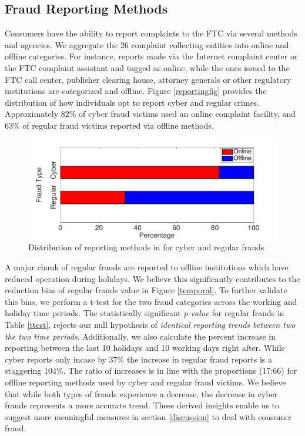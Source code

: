 \documentclass[conference]{IEEEtran}
\begin{document}
\subsection{Fraud Reporting Methods}\label{reportingmethods}
Consumers have the ability to report complaints to the FTC via several methods and agencies. We aggregate the 26 complaint collecting entities into online and offline categories. For instance, reports made via the Internet complaint center or the FTC complaint assistant and tagged as online, while the ones issued to the FTC call center, publisher clearing house, attorney generals or other regulatory institutions are categorized and offline. Figure \ref{reportingfig} provides the distribution of how individuals opt to report cyber and regular crimes. Approximately 82\% of cyber fraud victims used an online complaint facility, and 63\% of regular fraud victims reported via offline methods.


 \begin{figure}[b]
\centering
  \includegraphics[scale=0.35]{graphics/reporting_methods.pdf}
  \caption{Distribution of reporting methods in for cyber and regular frauds}
  \label{cdffig}
\end{figure}

A major chunk of regular frauds are reported to offline institutions which have reduced operation during holidays. We believe this significantly contributes to the reduction bias of regular frauds value in Figure \ref{temporal}. To further validate this bias, we perform a t-test for the two fraud categories across the working and holiday time periods. The statistically significant \emph{p-value} for regular frauds in Table \ref{ttest}, rejects our null hypothesis of \emph{identical reporting trends between two the two time periods}. Additionally, we also calculate the percent increase in reporting between the last 10 holidays and 10 working days right after. While cyber reports only incase by 37\% the increase in regular fraud reports is a staggering 104\%. The ratio of increases is in line with the proportions (17:66) for offline reporting methods used by cyber and regular fraud victims. We believe that while both types of frauds experience a decrease, the decrease in cyber frauds represents a more accurate trend. These derived insights enable us to suggest more meaningful measures in section \ref{discussion} to deal with consumer fraud.
\end{document}

